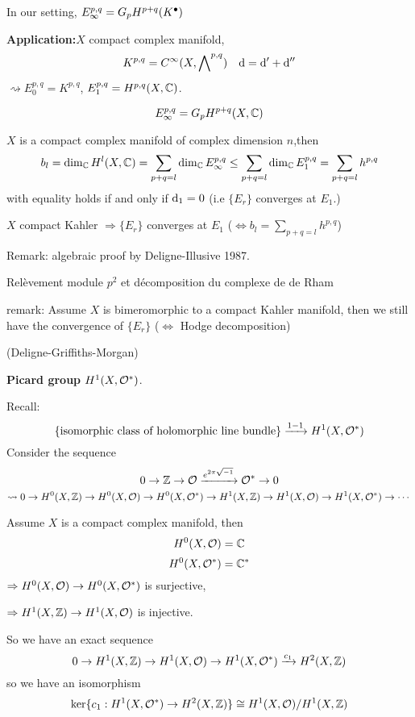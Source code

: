 In our setting, $E_\infty^{p,q}=G_pH^{p+q}(K^{\bullet})$

\textbf{Application:}$X$ compact complex manifold,
$$K^{p,q}=C^\infty(X,\bigwedge\nolimits^{p,q})\quad \mathrm{d}=\mathrm{d}'+\mathrm{d}''$$
$\rightsquigarrow E_0^{p,q}=K^{p,q}$,
$E_1^{p,q}=H^{p,q}(X,\mathbb{C})$.

\begin{cor}
$$E^{p,q}_\infty=G_pH^{p+q}(X,\mathbb{C})$$
\end{cor}

\begin{thm}
$X$ is a compact complex manifold of complex dimension $n$,then
$$b_l=\dim_{\mathbb{C}}H^l(X,\mathbb{C})=\sum_{p+q=l}\dim_{\mathbb{C}}E_\infty^{p,q}\leq
\sum_{p+q=l}\dim_{\mathbb{C}}E_1^{p,q}=\sum_{p+q=l}h^{p,q}$$
with equality holds if and only if $\mathrm{d}_1=0$
(i.e $\{E_r\}$ converges at $E_1$.)
\end{thm}

\begin{thm} $X$ compact Kahler $\Rightarrow\{E_r\}$ converges at $E_1$
($\iff b_l=\sum\limits_{p+q=l}h^{p,q}$)
\end{thm}

Remark: algebraic proof by Deligne-Illusive 1987.

Rel\`{e}vement module $p^2$ et d\'{e}composition du complexe de de Rham

remark: Assume $X$ is bimeromorphic to a compact Kahler manifold,
then we still have the convergence of $\{E_r\}$
($\iff$ Hodge decomposition)

(Deligne-Griffiths-Morgan)

\textbf{Picard group $H^1(X,\mathcal{O}^*)$}.

Recall:
$$\{\text{isomorphic class of holomorphic line bundle}\}
\xrightarrow{1-1} H^1(X,\mathcal{O}^*)$$
Consider the sequence
$$0\to\mathbb{Z}\to\mathcal{O}\xrightarrow{e^{2\pi\sqrt{-1}}}\mathcal{O}^*\to 0$$
$$
  \rightsquigarrow
  0\to H^0(X,\mathbb{Z})\to H^0(X,\mathcal{O})\to H^0(X,\mathcal{O}^*)
  \to H^1(X,\mathbb{Z})\to H^1(X,\mathcal{O})\to H^1(X,\mathcal{O}^*)\to\cdots
$$

Assume $X$ is a compact complex manifold, then
$$H^0(X,\mathcal{O})=\mathbb{C}$$
$$H^0(X,\mathcal{O}^*)=\mathbb{C}^*$$
$\Rightarrow H^0(X,\mathcal{O})\to H^0(X,\mathcal{O}^*)$ is surjective,

$\Rightarrow H^1(X,\mathbb{Z})\to H^1(X,\mathcal{O})$ is injective.

So we have an exact sequence
$$
  0\to H^1(X,\mathbb{Z})\to H^1(X,\mathcal{O})
  \to H^1(X,\mathcal{O}^*)\xrightarrow{c_1}H^2(X,\mathbb{Z})
$$
so we have an isomorphism
$$\ker\{c_1:H^1(X,\mathcal{O}^*)\to H^2(X,\mathbb{Z})\}\cong H^1(X,\mathcal{O})/H^1(X,\mathbb{Z})$$

